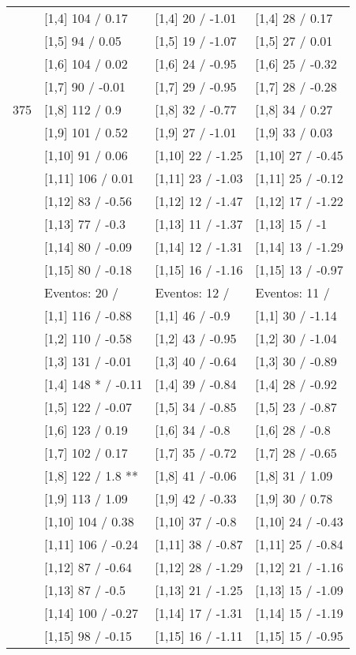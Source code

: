 \begin{table}
\begin{tabular}[t]{llll}
 & {}[1,4] 104  / 0.17 & {}[1,4] 20  / -1.01 & {}[1,4] 28  / 0.17\\
 & {}[1,5] 94  / 0.05 & {}[1,5] 19  / -1.07 & {}[1,5] 27  / 0.01\\
 & {}[1,6] 104  / 0.02 & {}[1,6] 24  / -0.95 & {}[1,6] 25  / -0.32\\
 & {}[1,7] 90  / -0.01 & {}[1,7] 29  / -0.95 & {}[1,7] 28  / -0.28\\
375 & {}[1,8] 112  / 0.9 & {}[1,8] 32  / -0.77 & {}[1,8] 34  / 0.27\\
\addlinespace
 & {}[1,9] 101  / 0.52 & {}[1,9] 27  / -1.01 & {}[1,9] 33  / 0.03\\
 & {}[1,10] 91  / 0.06 & {}[1,10] 22  / -1.25 & {}[1,10] 27  / -0.45\\
 & {}[1,11] 106  / 0.01 & {}[1,11] 23  / -1.03 & {}[1,11] 25  / -0.12\\
 & {}[1,12] 83  / -0.56 & {}[1,12] 12  / -1.47 & {}[1,12] 17  / -1.22\\
 & {}[1,13] 77  / -0.3 & {}[1,13] 11  / -1.37 & {}[1,13] 15  / -1\\
\addlinespace
 & {}[1,14] 80  / -0.09 & {}[1,14] 12  / -1.31 & {}[1,14] 13  / -1.29\\
 & {}[1,15] 80  / -0.18 & {}[1,15] 16  / -1.16 & {}[1,15] 13  / -0.97\\
 & Eventos:  20 / & Eventos:  12 / & Eventos:  11 /\\
 & {}[1,1] 116  / -0.88 & {}[1,1] 46  / -0.9 & {}[1,1] 30  / -1.14\\
 & {}[1,2] 110  / -0.58 & {}[1,2] 43  / -0.95 & {}[1,2] 30  / -1.04\\
\addlinespace
 & {}[1,3] 131  / -0.01 & {}[1,3] 40  / -0.64 & {}[1,3] 30  / -0.89\\
 & {}[1,4] 148 * / -0.11 & {}[1,4] 39  / -0.84 & {}[1,4] 28  / -0.92\\
 & {}[1,5] 122  / -0.07 & {}[1,5] 34  / -0.85 & {}[1,5] 23  / -0.87\\
 & {}[1,6] 123  / 0.19 & {}[1,6] 34  / -0.8 & {}[1,6] 28  / -0.8\\
 & {}[1,7] 102  / 0.17 & {}[1,7] 35  / -0.72 & {}[1,7] 28  / -0.65\\
\addlinespace
500 & {}[1,8] 122  / 1.8 ** & {}[1,8] 41  / -0.06 & {}[1,8] 31  / 1.09\\
 & {}[1,9] 113  / 1.09 & {}[1,9] 42  / -0.33 & {}[1,9] 30  / 0.78\\
 & {}[1,10] 104  / 0.38 & {}[1,10] 37  / -0.8 & {}[1,10] 24  / -0.43\\
 & {}[1,11] 106  / -0.24 & {}[1,11] 38  / -0.87 & {}[1,11] 25  / -0.84\\
 & {}[1,12] 87  / -0.64 & {}[1,12] 28  / -1.29 & {}[1,12] 21  / -1.16\\
\addlinespace
 & {}[1,13] 87  / -0.5 & {}[1,13] 21  / -1.25 & {}[1,13] 15  / -1.09\\
 & {}[1,14] 100  / -0.27 & {}[1,14] 17  / -1.31 & {}[1,14] 15  / -1.19\\
 & {}[1,15] 98  / -0.15 & {}[1,15] 16  / -1.11 & {}[1,15] 15  / -0.95\\
\bottomrule
\end{tabular}
\end{table}
